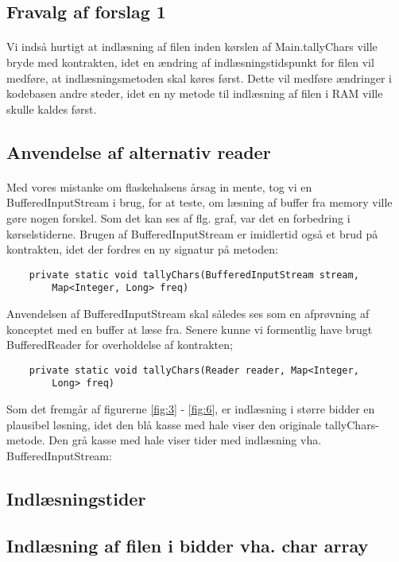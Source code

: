 \documentclass{article}
\begin{document}
\subsection{Fravalg af forslag 1}
\paragraph{}Vi indså hurtigt at indlæsning af filen inden kørslen af Main.tallyChars ville bryde med kontrakten, idet en ændring af indlæsningstidspunkt for filen vil medføre, at indlæsningsmetoden skal køres først. Dette vil medføre ændringer i kodebasen andre steder, idet en ny metode til indlæsning af filen i RAM ville skulle kaldes først.
\subsection{Anvendelse af alternativ reader}
\paragraph{}Med vores mistanke om flaskehalsens årsag in mente, tog vi en BufferedInputStream i brug, for at teste, om læsning af buffer fra memory ville gøre nogen forskel. Som det kan ses af flg. graf, var det en forbedring i kørselstiderne. Brugen af BufferedInputStream er imidlertid også et brud på kontrakten, idet der fordres en ny signatur på metoden:
\begin{verbatim}
    private static void tallyChars(BufferedInputStream stream, 
        Map<Integer, Long> freq)
\end{verbatim}
Anvendelsen af BufferedInputStream skal således ses som en afprøvning af konceptet med en buffer at læse fra. Senere kunne vi formentlig have brugt BufferedReader for overholdelse af kontrakten;
\begin{verbatim}
    private static void tallyChars(Reader reader, Map<Integer, 
        Long> freq)
\end{verbatim}
Som det fremgår af figurerne \ref{fig:3} - \ref{fig:6}, er indlæsning i større bidder en plausibel løsning, idet den blå kasse med hale viser den originale tallyChars-metode. Den grå kasse med hale viser tider med indlæsning vha. BufferedInputStream:
\pagebreak
\subsection{Indlæsningstider}
    
\subsection{Indlæsning af filen i bidder vha. char array}
\end{document}
